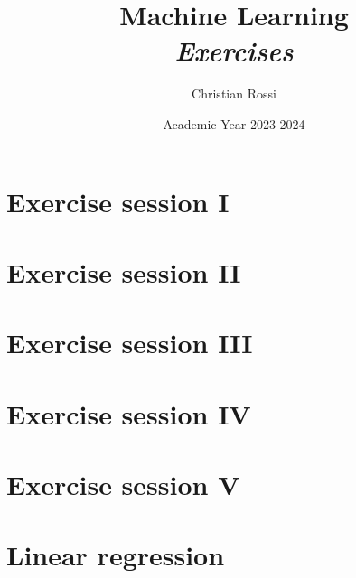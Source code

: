 \documentclass[12pt, a4paper]{report}
\title{Machine Learning \\ \textit{Exercises}}
\author{Christian Rossi}
\date{Academic Year 2023-2024}
\begin{document}
    \maketitle

    

    \cleardoublepage{}

    \tableofcontents

    \cleardoublepage{}

    \chapter{Exercise session I}
    
    
    
    

    \chapter{Exercise session II}
    
    
    
    

    \chapter{Exercise session III}
    
    
    

    \chapter{Exercise session IV}
    
    
    

    \chapter{Exercise session V}
    
    
    
    
    \appendix
    \chapter{Linear regression}
    
    
    
\end{document}

